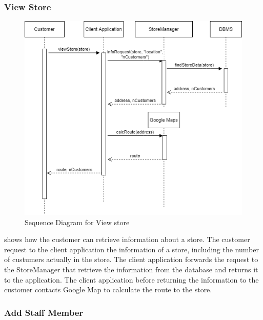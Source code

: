 \subsubsection{View Store} %
\begin{figure}[H]
    \centering
    \includegraphics[height=0.4\textwidth]{Images/CustomerSequenceDiagrams/ViewStoreSequenceDiagram.png}
    \caption{Sequence Diagram for View store}
    \label{fig:SDViewStore}
\end{figure}
 shows how the customer can retrieve information about a store.
The customer request to the client application the information of a store, including the number of custumers actually in the store.
The client application forwards the request to the StoreManager that retrieve the information from the database and returns it to the application.
The client application before returning the information to the customer contacts Google Map to calculate the route to the store.

\subsubsection{Add Staff Member}

